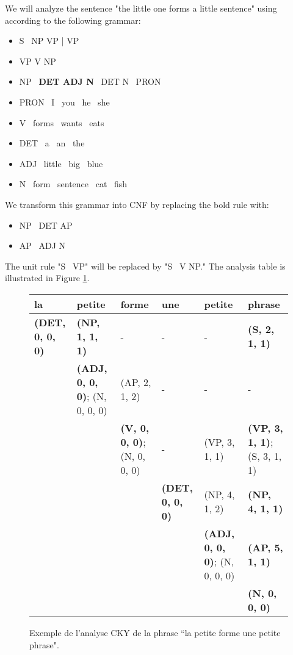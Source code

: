 \documentclass{KodeBook}
\begin{document}
We will analyze the sentence "the little one forms a little sentence" using  according to the following grammar:
\begin{itemize}
	\item S \textrightarrow\ NP VP | VP
	\item VP \textrightarrow V NP
	\item NP \textrightarrow\ \textbf{DET ADJ N} \textbar\ DET N \textbar\ PRON 
	\item PRON \textrightarrow\ I \textbar\ you \textbar\ he \textbar\ she
	\item V \textrightarrow\ forms \textbar\ wants \textbar\ eats 
	\item DET \textrightarrow\ a \textbar\ an \textbar\ the
	\item ADJ \textrightarrow\ little \textbar\ big \textbar\ blue 
	\item N \textrightarrow\ form \textbar\ sentence \textbar\ cat \textbar\ fish
\end{itemize}
We transform this grammar into CNF by replacing the bold rule with:
\begin{itemize}
	\item NP \textrightarrow\ DET AP
	\item AP \textrightarrow\ ADJ N
\end{itemize}
The unit rule "S \textrightarrow\ VP" will be replaced by "S \textrightarrow\ V NP."
The analysis table is illustrated in Figure \ref{fig:exp-cky-trait}.

\begin{figure}[ht]
\begin{tabular}{|p{2.3cm}|p{2.5cm}|p{2.3cm}|p{2.3cm}|p{2.5cm}|p{2.2cm}|}
	\hline
	la & petite & forme & une & petite & phrase \\
	\hline
	\textbf{(DET, 0, 0, 0)} & \textbf{(NP, 1, 1, 1)} & - & - & - & \textbf{(S, 2, 1, 1)} \\
	\hline
	\multicolumn{1}{l|}{}& \textbf{(ADJ, 0, 0, 0)}; (N, 0, 0, 0) & (AP, 2, 1, 2) & - & - & - \\
	\cline{2-6}
	\multicolumn{2}{l|}{}& \textbf{(V, 0, 0, 0)}; (N, 0, 0, 0) & - & (VP, 3, 1, 1) & \textbf{(VP, 3, 1, 1)}; (S, 3, 1, 1) \\
	\cline{3-6}
	\multicolumn{3}{l|}{}& \textbf{(DET, 0, 0, 0)} & (NP, 4, 1, 2) & \textbf{(NP, 4, 1, 1)} \\
	\cline{4-6}
	\multicolumn{4}{l|}{}& \textbf{(ADJ, 0, 0, 0)}; (N, 0, 0, 0) & \textbf{(AP, 5, 1, 1)} \\
	\cline{5-6}
	\multicolumn{5}{l|}{}& \textbf{(N, 0, 0, 0)} \\
	\cline{6-6}
\end{tabular}
\caption[Exemple de l'analyse CKY.]{Exemple de l'analyse CKY de la phrase ``la petite forme une petite phrase".}
\label{fig:exp-cky-trait}
\end{figure}
\end{document}
